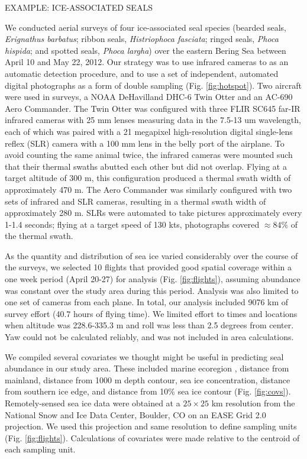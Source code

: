 \documentclass[12pt,fleqn]{article}
\begin{document}
\begin{flushleft}
\vspace{.15in}
EXAMPLE: ICE-ASSOCIATED SEALS\\
\vspace{.15in}

We conducted aerial surveys of four ice-associated seal species (bearded seals, {\it Erignathus barbatus}; ribbon seals, {\it Histriophoca fasciata}; ringed seals, {\it Phoca hispida}; and spotted seals, {\it Phoca largha}) over the eastern Bering Sea between April 10 and May 22, 2012.  Our strategy was to use infrared cameras to as an automatic detection procedure, and to use a set of independent, automated digital photographs as a form of double sampling (Fig. \ref{fig:hotspot}).  Two aircraft were used in surveys, a NOAA DeHavilland DHC-6 Twin Otter and an AC-690 Aero Commander.  The Twin Otter was configured with three FLIR SC645 far-IR infrared cameras with 25 mm lenses measuring data in the 7.5-13 um wavelength, each of which was paired with a 21 megapixel high-resolution digital single-lens reflex (SLR) camera with a 100 mm lens in the belly port of the airplane.  To avoid counting the same animal twice, the infrared cameras were mounted such that their thermal swaths abutted each other but did not overlap.  Flying at a target altitude of 300 m, this configuration produced a thermal swath width of approximately 470 m.  The Aero Commander was similarly configured with two sets of infrared and SLR cameras, resulting in a thermal swath width of approximately 280 m. SLRs were automated to take pictures approximately every 1-1.4 seconds; flying at a target speed of 130 kts, photographs covered $\approx 84\%$ of the thermal swath.

\hspace{.5in}As the quantity and distribution of sea ice varied considerably over the course of the surveys, we selected 10 flights that provided good spatial coverage within a one week period (April 20-27) for analysis (Fig. \ref{fig:flights}), assuming abundance was constant over the study area during this period. Analysis was also limited to one set of cameras from each plane.  In total, our analysis included 9076 km of survey effort (40.7 hours of flying time).  We limited effort to times and locations when altitude was 228.6-335.3 m and roll was less than 2.5 degrees from center.  Yaw could not be calculated reliably, and was not included in area calculations.

\hspace{.5in}We compiled several covariates we thought might be useful in predicting seal abundance in our study area. These included marine ecoregion \citep[cf.][]{PiattSpringer2007}, distance from mainland, distance from 1000 m depth contour, sea ice concentration, distance from southern ice edge, and distance from 10\% sea ice contour (Fig. \ref{fig:covs}).  Remotely-sensed sea ice data were obtained at a $25 \times 25$ km resolution from the National Snow and Ice Data Center, Boulder, CO on an EASE Grid 2.0 projection.  We used this projection and same resolution to define sampling units (Fig. \ref{fig:flights}). Calculations of covariates were made relative to the centroid of each sampling unit.


\end{flushleft}
\end{document}
